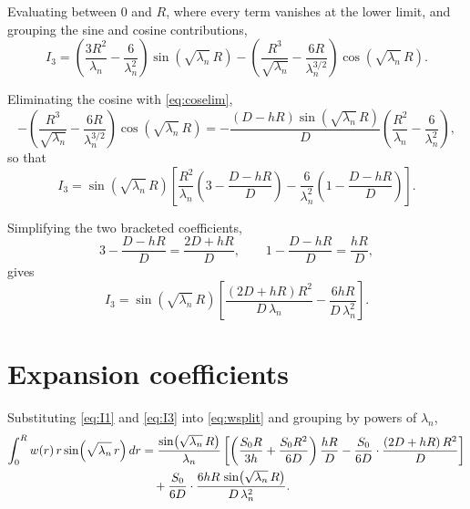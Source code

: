 \documentclass[11pt,a4paper]{article}
\begin{document}
Evaluating between $0$ and $R$, where every term vanishes at the lower limit, and
grouping the sine and cosine contributions,
\begin{equation}
I_{3}
= \left(\frac{3R^{2}}{\lambda_{n}} - \frac{6}{\lambda_{n}^{2}}\right)
\sin\!\left(\sqrt{\lambda_{n}}\,R\right)
- \left(\frac{R^{3}}{\sqrt{\lambda_{n}}} - \frac{6R}{\lambda_{n}^{3/2}}\right)
\cos\!\left(\sqrt{\lambda_{n}}\,R\right) .
\end{equation}

Eliminating the cosine with \eqref{eq:coselim},
\begin{equation}
- \left(\frac{R^{3}}{\sqrt{\lambda_{n}}} - \frac{6R}{\lambda_{n}^{3/2}}\right)
\cos\!\left(\sqrt{\lambda_{n}}\,R\right)
= -\frac{\left(D - hR\right)\sin\!\left(\sqrt{\lambda_{n}}\,R\right)}{D}
\left(\frac{R^{2}}{\lambda_{n}} - \frac{6}{\lambda_{n}^{2}}\right) ,
\end{equation}
so that
\begin{equation}
I_{3} = \sin\!\left(\sqrt{\lambda_{n}}\,R\right)
\left[\frac{R^{2}}{\lambda_{n}}\left(3 - \frac{D - hR}{D}\right)
- \frac{6}{\lambda_{n}^{2}}\left(1 - \frac{D - hR}{D}\right)\right] .
\end{equation}

Simplifying the two bracketed coefficients,
\begin{equation}
3 - \frac{D - hR}{D} = \frac{2D + hR}{D} ,
\qquad
1 - \frac{D - hR}{D} = \frac{hR}{D} ,
\end{equation}
gives
\begin{equation}
\boxed{\;
I_{3} = \sin\!\left(\sqrt{\lambda_{n}}\,R\right)
\left[\frac{\left(2D + hR\right)R^{2}}{D\,\lambda_{n}}
- \frac{6hR}{D\,\lambda_{n}^{2}}\right] .
\;}
\label{eq:I3}
\end{equation}

\section{Expansion coefficients}

Substituting \eqref{eq:I1} and \eqref{eq:I3} into \eqref{eq:wsplit} and grouping by
powers of $\lambda_{n}$,
\begin{align}
\int_{0}^{R} w(r)\, r\sin\!\left(\sqrt{\lambda_{n}}\,r\right) dr
&= \frac{\sin\!\left(\sqrt{\lambda_{n}}\,R\right)}{\lambda_{n}}
\left[\left(\frac{S_{0}R}{3h} + \frac{S_{0}R^{2}}{6D}\right)\frac{hR}{D}
- \frac{S_{0}}{6D}\cdot\frac{\left(2D + hR\right)R^{2}}{D}\right] \notag \\
&\quad + \frac{S_{0}}{6D}\cdot
\frac{6hR\,\sin\!\left(\sqrt{\lambda_{n}}\,R\right)}{D\,\lambda_{n}^{2}} .
\label{eq:grouped}
\end{align}
\end{document}
